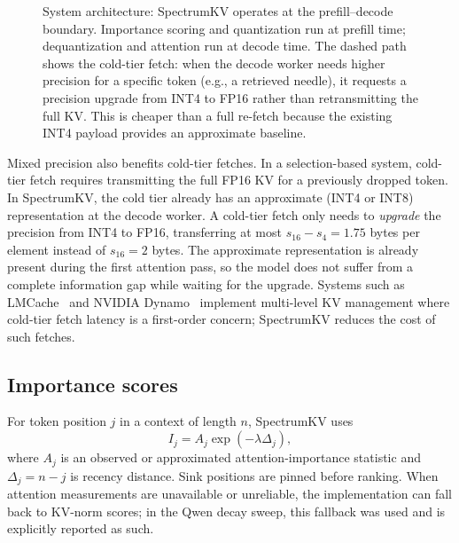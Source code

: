 \documentclass[11pt]{article}
\newcommand{\method}{SpectrumKV}
\theoremstyle{plain}
\theoremstyle{definition}
\begin{document}
\begin{figure}[t]
{%
}
\caption{System architecture: \method{} operates at the prefill--decode boundary.  Importance scoring and quantization run at prefill time; dequantization and attention run at decode time.  The dashed path shows the cold-tier fetch: when the decode worker needs higher precision for a specific token (e.g., a retrieved needle), it requests a precision upgrade from INT4 to FP16 rather than retransmitting the full KV.  This is cheaper than a full re-fetch because the existing INT4 payload provides an approximate baseline.}
\label{fig:sysarch}
\end{figure}

Mixed precision also benefits cold-tier fetches.  In a selection-based system, cold-tier fetch requires transmitting the full FP16 KV for a previously dropped token.  In \method{}, the cold tier already has an approximate (INT4 or INT8) representation at the decode worker.  A cold-tier fetch only needs to \emph{upgrade} the precision from INT4 to FP16, transferring at most $s_{16}-s_4 = 1.75$ bytes per element instead of $s_{16} = 2$ bytes.  The approximate representation is already present during the first attention pass, so the model does not suffer from a complete information gap while waiting for the upgrade.  Systems such as LMCache~\citep{lmcache} and NVIDIA Dynamo~\citep{nvidiadynamo} implement multi-level KV management where cold-tier fetch latency is a first-order concern; \method{} reduces the cost of such fetches.

\subsection{Importance scores}
For token position $j$ in a context of length $n$, \method{} uses
\begin{equation}
  I_j = A_j \exp(-\lambda \Delta_j),
  \label{eq:importance}
\end{equation}
where $A_j$ is an observed or approximated attention-importance statistic and $\Delta_j=n-j$ is recency distance.  Sink positions are pinned before ranking.  When attention measurements are unavailable or unreliable, the implementation can fall back to KV-norm scores; in the Qwen decay sweep, this fallback was used and is explicitly reported as such.
\end{document}

